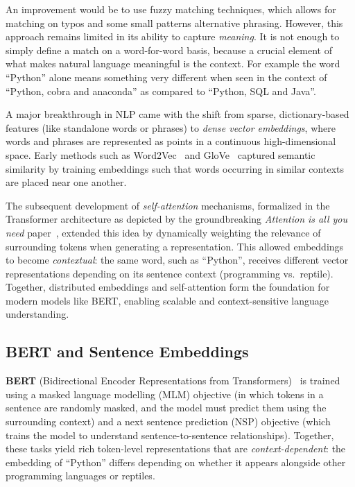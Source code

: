 An improvement would be to use fuzzy matching techniques, which allows for matching on typos and some small patterns alternative phrasing.
However, this approach remains limited in its ability to capture \emph{meaning}. It is not enough to simply define a match on a word-for-word basis, because a crucial element of what makes natural language meaningful is the context.
For example the word ``Python'' alone means something very different when seen in the context of ``Python, cobra and anaconda'' as compared to ``Python, SQL and Java''.

A major breakthrough in NLP came with the shift from sparse, dictionary-based features (like standalone words or phrases) to \emph{dense vector embeddings}, where words and phrases are represented as points in a continuous high-dimensional space.
Early methods such as Word2Vec~\cite{mikolov_2013_EfficientEstimation} and GloVe~\cite{pennington_2014_GloveGlobal} captured semantic similarity by training embeddings such that words occurring in similar contexts are placed near one another.

The subsequent development of \emph{self-attention} mechanisms, formalized in the Transformer architecture as depicted by the groundbreaking \emph{Attention is all you need} paper~\cite{vaswani_2017_AttentionAll}, extended this idea by dynamically weighting the relevance of surrounding tokens when generating a representation.
This allowed embeddings to become \emph{contextual}: the same word, such as ``Python'', receives different vector representations depending on its sentence context (programming vs.\ reptile).
Together, distributed embeddings and self-attention form the foundation for modern models like BERT, enabling scalable and context-sensitive language understanding.

\subsection{BERT and Sentence Embeddings}

\textbf{BERT} (Bidirectional Encoder Representations from Transformers)~\cite{devlin_2019_BERTPretraining} is trained using a masked language modelling (MLM) objective (in which tokens in a sentence are randomly masked, and the model must predict them using the surrounding context) and a next sentence prediction (NSP) objective (which trains the model to understand sentence-to-sentence relationships).
Together, these tasks yield rich token-level representations that are \emph{context-dependent}: the embedding of ``Python'' differs depending on whether it appears alongside other programming languages or reptiles.

